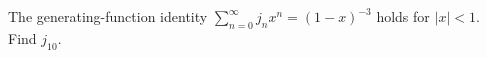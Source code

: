 The generating-function identity $\sum_{n=0}^{\infty}j_nx^n=(1-x)^{-3}$ holds for $|x|<1 $. Find $ j_{10}$.
